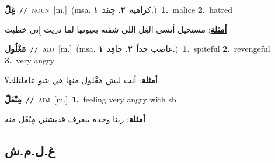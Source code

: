 \documentclass[10pt,a4paper,twoside]{article} %
\begin{document}
\begin{multicols}{2}
{\setlength\topsep{0pt}\textbf{\foreignlanguage{arabic}{غِلّ}}\ {\color{gray}\texttt{//}\color{black}}\ \textsc{noun}\ [m.]\ \color{gray}(msa. \foreignlanguage{arabic}{كراهية}~\foreignlanguage{arabic}{\textbf{٢.}}  \foreignlanguage{arabic}{حِقد}~\foreignlanguage{arabic}{\textbf{١.}})\color{black}\ \textbf{1.}~malice  \textbf{2.}~hatred\  \begin{flushright}\color{gray}\foreignlanguage{arabic}{\textbf{\underline{\foreignlanguage{arabic}{أمثلة}}}: مستحيل أنسى الغِل اللي شفته بعيونها لما دريت إِني خطبت}\end{flushright}\color{black}} \vspace{2mm}

{\setlength\topsep{0pt}\textbf{\foreignlanguage{arabic}{مَغْلُول}}\ {\color{gray}\texttt{//}\color{black}}\ \textsc{adj}\ [m.]\ \color{gray}(msa. \foreignlanguage{arabic}{غاضب جداً}~\foreignlanguage{arabic}{\textbf{٢.}}  \foreignlanguage{arabic}{حاقِد}~\foreignlanguage{arabic}{\textbf{١.}})\color{black}\ \textbf{1.}~spiteful  \textbf{2.}~revengeful  \textbf{3.}~very angry\  \begin{flushright}\color{gray}\foreignlanguage{arabic}{\textbf{\underline{\foreignlanguage{arabic}{أمثلة}}}: أنت ليش مَغْلول منها هي شو عاملتلك؟}\end{flushright}\color{black}} \vspace{2mm}

{\setlength\topsep{0pt}\textbf{\foreignlanguage{arabic}{مِنْغَلّ}}\ {\color{gray}\texttt{//}\color{black}}\ \textsc{adj}\ [m.]\ \textbf{1.}~feeling very angry with sb\  \begin{flushright}\color{gray}\foreignlanguage{arabic}{\textbf{\underline{\foreignlanguage{arabic}{أمثلة}}}: ربنا وحده بيعرف قديشني مِنْغَل منه}\end{flushright}\color{black}} \vspace{2mm}

\vspace{-3mm}
\subsection*{\color{blue}\foreignlanguage{arabic}{غ.ل.م.ش}\color{blue}{ (ntws)}} 


\end{multicols}
\end{document}
